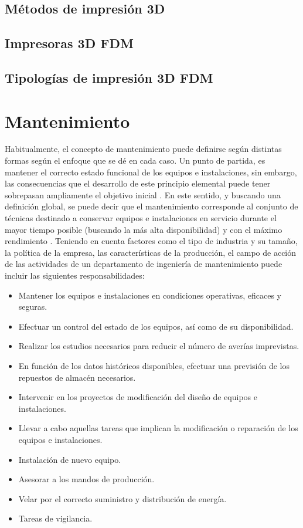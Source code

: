 \subsection{Métodos de impresión 3D}




\subsection{Impresoras 3D FDM}

\subsection{Tipologías de impresión 3D FDM}

\section{Mantenimiento}

Habitualmente, el concepto de mantenimiento puede definirse según distintas formas según el enfoque que se dé en cada caso. Un punto de partida, es mantener el correcto estado funcional de los equipos e instalaciones, sin embargo, las consecuencias que el desarrollo de este principio elemental puede tener sobrepasan ampliamente el objetivo inicial \citep{gomez1998}. En este sentido, y buscando una definición global, se puede decir que el mantenimiento corresponde al conjunto de técnicas destinado a conservar equipos e instalaciones en servicio durante el mayor tiempo posible (buscando la más alta disponibilidad) y con el máximo rendimiento \citep{garcia2010}.
Teniendo en cuenta factores como el tipo de industria y su tamaño, la política de la empresa, las características de la producción, el campo de acción de las actividades de un departamento de ingeniería de mantenimiento puede incluir las siguientes responsabilidades\citep{gomez1998}: \\

\begin{itemize}
\item Mantener los equipos e instalaciones en condiciones operativas, eficaces y seguras.
\item Efectuar un control del estado de los equipos, así como de su disponibilidad.
\item Realizar los estudios necesarios para reducir el número de averías imprevistas.
\item En función de los datos históricos disponibles, efectuar una previsión de los repuestos de almacén necesarios.
\item Intervenir en los proyectos de modificación del diseño de equipos e instalaciones.
\item Llevar a cabo aquellas tareas que implican la modificación o reparación de los equipos e instalaciones.
\item Instalación de nuevo equipo.
\item Asesorar a los mandos de producción.
\item Velar por el correcto suministro y distribución de energía.
\item Tareas de vigilancia.
\end{itemize}

